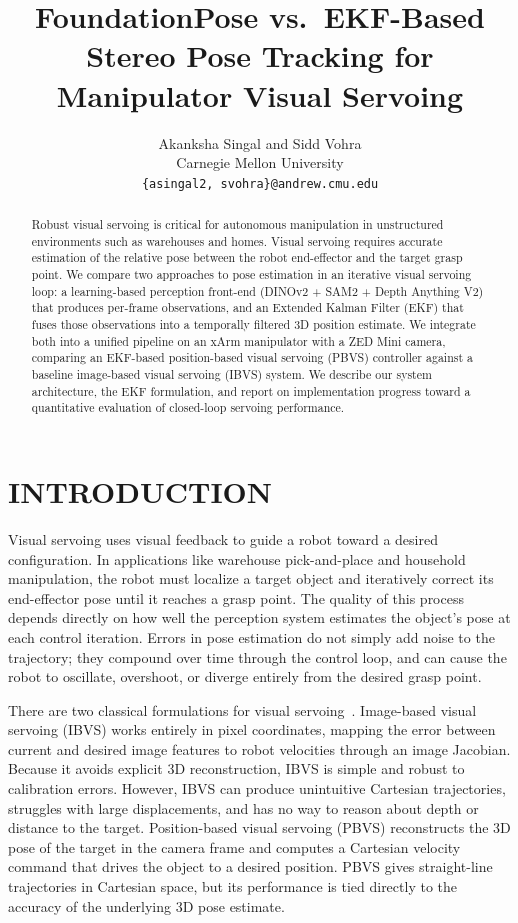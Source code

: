 \documentclass[letterpaper, 10 pt, conference]{ieeeconf}  %
\title{\LARGE \bf
FoundationPose vs.\ EKF-Based Stereo Pose Tracking for Manipulator Visual Servoing
}
\author{Akanksha Singal and Sidd Vohra\\
Carnegie Mellon University\\
{\tt\small \{asingal2, svohra\}@andrew.cmu.edu}
}
\begin{document}
\maketitle
\thispagestyle{empty}
\pagestyle{empty}

\begin{abstract}
Robust visual servoing is critical for autonomous manipulation in unstructured environments such as warehouses and homes. Visual servoing requires accurate estimation of the relative pose between the robot end-effector and the target grasp point. We compare two approaches to pose estimation in an iterative visual servoing loop: a learning-based perception front-end (DINOv2 + SAM2 + Depth Anything V2) that produces per-frame observations, and an Extended Kalman Filter (EKF) that fuses those observations into a temporally filtered 3D position estimate. We integrate both into a unified pipeline on an xArm manipulator with a ZED Mini camera, comparing an EKF-based position-based visual servoing (PBVS) controller against a baseline image-based visual servoing (IBVS) system. We describe our system architecture, the EKF formulation, and report on implementation progress toward a quantitative evaluation of closed-loop servoing performance.
\end{abstract}


\section{INTRODUCTION}

Visual servoing uses visual feedback to guide a robot toward a desired configuration. In applications like warehouse pick-and-place and household manipulation, the robot must localize a target object and iteratively correct its end-effector pose until it reaches a grasp point. The quality of this process depends directly on how well the perception system estimates the object's pose at each control iteration. Errors in pose estimation do not simply add noise to the trajectory; they compound over time through the control loop, and can cause the robot to oscillate, overshoot, or diverge entirely from the desired grasp point.

There are two classical formulations for visual servoing~\cite{chaumette2006}. Image-based visual servoing (IBVS) works entirely in pixel coordinates, mapping the error between current and desired image features to robot velocities through an image Jacobian. Because it avoids explicit 3D reconstruction, IBVS is simple and robust to calibration errors. However, IBVS can produce unintuitive Cartesian trajectories, struggles with large displacements, and has no way to reason about depth or distance to the target. Position-based visual servoing (PBVS) reconstructs the 3D pose of the target in the camera frame and computes a Cartesian velocity command that drives the object to a desired position. PBVS gives straight-line trajectories in Cartesian space, but its performance is tied directly to the accuracy of the underlying 3D pose estimate.
\end{document}

